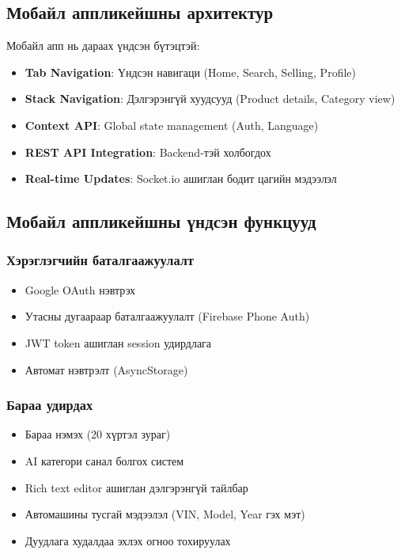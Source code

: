 \subsection{Мобайл аппликейшны архитектур}
Мобайл апп нь дараах үндсэн бүтэцтэй:
\begin{itemize}
    \item \textbf{Tab Navigation}: Үндсэн навигаци (Home, Search, Selling, Profile)
    \item \textbf{Stack Navigation}: Дэлгэрэнгүй хуудсууд (Product details, Category view)
    \item \textbf{Context API}: Global state management (Auth, Language)
    \item \textbf{REST API Integration}: Backend-тэй холбогдох
    \item \textbf{Real-time Updates}: Socket.io ашиглан бодит цагийн мэдээлэл
\end{itemize}

\subsection{Мобайл аппликейшны үндсэн функцууд}
\subsubsection{Хэрэглэгчийн баталгаажуулалт}
\begin{itemize}
    \item Google OAuth нэвтрэх
    \item Утасны дугаараар баталгаажуулалт (Firebase Phone Auth)
    \item JWT token ашиглан session удирдлага
    \item Автомат нэвтрэлт (AsyncStorage)
\end{itemize}

\subsubsection{Бараа удирдах}
\begin{itemize}
    \item Бараа нэмэх (20 хүртэл зураг)
    \item AI категори санал болгох систем
    \item Rich text editor ашиглан дэлгэрэнгүй тайлбар
    \item Автомашины тусгай мэдээлэл (VIN, Model, Year гэх мэт)
    \item Дуудлага худалдаа эхлэх огноо тохируулах
\end{itemize}

